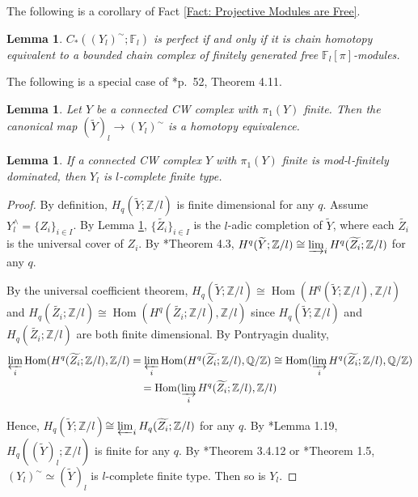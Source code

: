 \documentclass[11pt]{amsart}
\newtheorem{lemma}[theorem]{Lemma}
\theoremstyle{definition}
\numberwithin{equation}{section}
\numberwithin{equation}{section}
\newcommand\QQ{\mathbb{Q}}
\newcommand\ZZ{\mathbb{Z}}
\newcommand\FF{\mathbb{F}}
\DeclareMathOperator{\homo}{Hom}
\begin{document}
The following is a corollary of Fact \ref{Fact: Projective Modules are Free}.

\begin{lemma}
$C_*((Y_l)^{\sim};\FF_l)$ is perfect if and only if it is chain homotopy equivalent to a bounded chain complex of finitely generated free $\FF_l[\pi]$-modules.
\end{lemma}

The following is a special case of \cite{artin-mazur-etale-homotopy}*{p.~52, Theorem 4.11}. 

\begin{lemma}\label{Lem: Commutativity of universal cover and l-completion}
Let $Y$ be a connected CW complex with $\pi_1(Y)$ finite. Then the canonical map $(\widetilde{Y})_l\rightarrow (Y_l)^{\sim}$ is a homotopy equivalence.
\end{lemma}


\begin{lemma}\label{Lem: Finite dominated implies finite type}
If a connected CW complex $Y$ with $\pi_1(Y)$ finite is mod-$l$-finitely dominated, then $Y_l$ is $l$-complete finite type.
\end{lemma}

\begin{proof}
By definition, $H_q(\widetilde{Y};\ZZ/l)$ is finite dimensional for any $q$. Assume $Y^{\wedge}_l=\{Z_i\}_{i\in I}$. By Lemma \ref{Lem: Commutativity of universal cover and l-completion}, $\{\widetilde{Z_i}\}_{i\in I}$ is the $l$-adic completion of $\widetilde{Y}$, where each $\widetilde{Z_i}$ is the universal cover of $Z_i$. By \cite{artin-mazur-etale-homotopy}*{Theorem 4.3}, $H^q(\widetilde{Y};\ZZ/l)\cong \varinjlim_i H^q(\widetilde{Z_i};\ZZ/l)$ for any $q$. 

By the universal coefficient theorem, $H_q(\widetilde{Y};\ZZ/l)\cong \homo(H^q(\widetilde{Y};\ZZ/l),\ZZ/l)$ and $H_q(\widetilde{Z_i};\ZZ/l)\cong \homo(H^q(\widetilde{Z_i};\ZZ/l),\ZZ/l)$ since $H_q(\widetilde{Y};\ZZ/l)$ and $H_q(\widetilde{Z_i};\ZZ/l)$ are both finite dimensional. By Pontryagin duality, 
\begin{multline*}
\varprojlim_i \homo(H^q(\widetilde{Z_i};\ZZ/l),\ZZ/l)=\varprojlim_i \homo(H^q(\widetilde{Z_i};\ZZ/l),\QQ/\ZZ)\cong \homo(\varinjlim_i H^q(\widetilde{Z_i};\ZZ/l),\QQ/\ZZ) \\
= \homo(\varinjlim_i H^q(\widetilde{Z_i};\ZZ/l),\ZZ/l)
\end{multline*}

Hence, $H_q(\widetilde{Y};\ZZ/l)$$\cong \varprojlim_i H_q(\widetilde{Z_i};\ZZ/l)$ for any $q$. By \cite{Hu-Zhang-formal-manifold}*{Lemma 1.19}, $H_q((\widetilde{Y})_l;\ZZ/l)$ is finite for any $q$. By \cite{Lurie-rational-p-profinite}*{Theorem 3.4.12} or \cite{Hu-Zhang-formal-manifold}*{Theorem 1.5}, $(Y_l)^{\sim}\simeq( \widetilde{Y})_l$ is $l$-complete finite type. Then so is $Y_l$. 
\end{proof}
\end{document}
